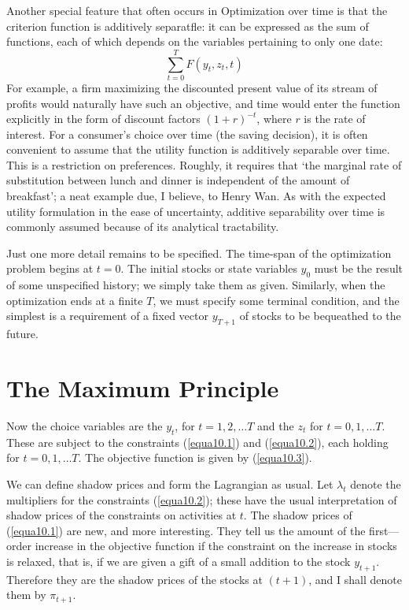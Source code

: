 Another special feature that often occurs in Optimization over time is that the criterion function is additively separatfle: it can be expressed as the sum of functions, each of which depends on the variables pertaining to only one date:
\begin{equation} \label{equa10.3}
  \sum\limits_{t=0}^T  F(y_t, z_t, t)  
\end{equation}
For example, a firm maximizing the discounted present value of its stream of profits would naturally have such an objective, and time would enter the function explicitly in the form of discount factors $(1 + r)^{-t}$, where $r$ is the rate of interest. For a consumer's choice over time (the saving decision), it is often convenient to assume that the utility function is additively separable over time. This is a restriction on preferences. Roughly, it requires that `the marginal rate of substitution between lunch and dinner is independent of the amount of breakfast'; a neat example due, I believe, to Henry Wan.
As with the expected utility formulation in the ease of uncertainty, additive separability over time is commonly assumed because of its analytical tractability.

Just one more detail remains to be specified. The time-span of the optimization problem begins at $t = 0$. The initial stocks or state variables $y_0$ must be the result of some unspecified history; we simply take them as given. Similarly, when the optimization ends at a finite $T$, we must specify some terminal condition, and the simplest is a requirement of a fixed vector $y_{T+1}$ of stocks to be bequeathed to the future.

\section*{The Maximum Principle}

Now the choice variables are the $y_t$, for $t = 1,2, \dots T$ and the $z_t$ for $t = 0,1, \dots T$. These are subject to the constraints (\ref{equa10.1}) and (\ref{equa10.2}), each holding for $t = 0,1, \dots T$. The objective function is given by (\ref{equa10.3}).

We can define shadow prices and form the Lagrangian as usual. Let $\lambda_t$ denote the multipliers for the constraints (\ref{equa10.2}); these have the usual interpretation of shadow prices of the constraints on activities at $t$. The shadow prices of (\ref{equa10.1}) are new, and more interesting. They tell us the amount of the first—order increase in the objective function if the constraint on the increase in stocks is relaxed, that is, if we are given a gift of a small addition to the
stock $y_{t+1}$. Therefore they are the shadow prices of the stocks at $(t + 1)$, and I shall denote them by $\pi_{t+1}$.

